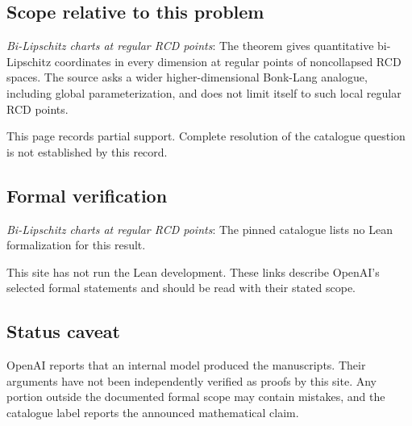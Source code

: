 \documentclass[11pt]{article}
\begin{document}
\subsection{Scope relative to this problem}
\textit{Bi-Lipschitz charts at regular RCD points}: The theorem gives quantitative bi-Lipschitz coordinates in every dimension at regular points of noncollapsed RCD spaces. The source asks a wider higher-dimensional Bonk-Lang analogue, including global parameterization, and does not limit itself to such local regular RCD points.

This page records partial support. Complete resolution of the catalogue question is not established by this record.

\subsection{Formal verification}
\textit{Bi-Lipschitz charts at regular RCD points}: The pinned catalogue lists no Lean formalization for this result.

This site has not run the Lean development. These links describe OpenAI’s selected formal statements and should be read with their stated scope.

\subsection{Status caveat}
OpenAI reports that an internal model produced the manuscripts. Their arguments have not been independently verified as proofs by this site. Any portion outside the documented formal scope may contain mistakes, and the catalogue label reports the announced mathematical claim.
\end{document}

